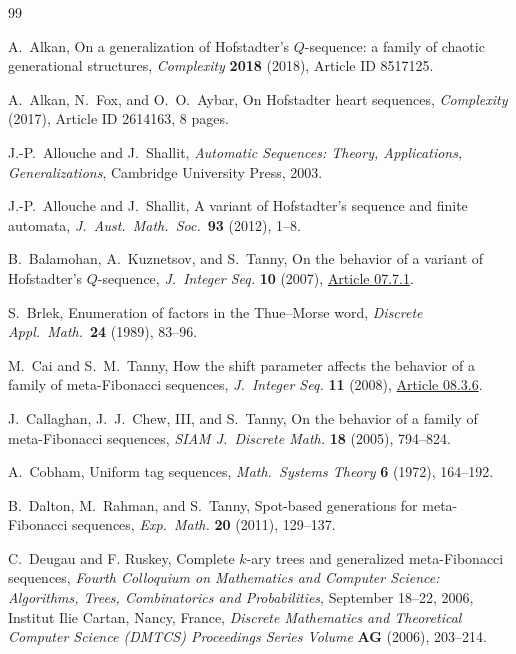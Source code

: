 \documentclass[12pt,reqno]{article}
\theoremstyle{plain}
\theoremstyle{definition}
\theoremstyle{remark}
\begin{document}
\begin{thebibliography}{99}
 
 A.\ Alkan, 
 On a generalization of {Hofstadter}'s {{\(Q\)}}-sequence: a family of chaotic generational structures, 
 {\it Complexity} {\bf 2018} (2018), Article ID 8517125. 
 
 A.\ Alkan, N.\ Fox, and O.\ O.\ Aybar, 
 On Hofstadter heart sequences, 
 {\it Complexity} (2017), Article ID 2614163, 8 pages. 

 J.-P.\ Allouche and J.\ Shallit,
 \emph{Automatic Sequences: Theory, Applications, Generalizations},
 Cambridge University Press, 2003.

 J.-P.\ Allouche and J.\ Shallit,
 A variant of Hofstadter's sequence and finite automata,
 \emph{J.\ Aust.\ Math.\ Soc.}\ \textbf{93} (2012), 1--8.

 B.\ Balamohan, A.\ Kuznetsov, and S.\ Tanny,
 On the behavior of a variant of Hofstadter's {$Q$}-sequence, 
 {\it J.\ Integer Seq.} {\bf 10} 
 (2007), \href{https://cs.uwaterloo.ca/journals/JIS/VOL10/Tanny/tanny3.html}{Article 07.7.1}. 

 S.\ Brlek,
Enumeration of factors in the Thue--Morse word,
\emph{Discrete Appl.\ Math.}\ \textbf{24} (1989), 83--96.

 M.\ Cai and S.\ M.\ Tanny,
 How the shift parameter affects the behavior of a family of meta-{F}ibonacci sequences, 
 {\it J.\ Integer Seq.} {\bf 11} (2008), \href{https://cs.uwaterloo.ca/journals/JIS/VOL11/Tanny2/tanny.html}{Article 08.3.6}. 

 J.\ Callaghan, J.\ J.\ Chew, III, and S.\ Tanny,
 On the behavior of a family of meta-{F}ibonacci sequences, 
 {\it SIAM J.\ Discrete Math.} {\bf 18} (2005), 794--824. 

 A.\ Cobham,
Uniform tag sequences,
\emph{Math.\ Systems Theory} \textbf{6} (1972), 164--192.

 B.\ Dalton, M.\ Rahman, and S.\ Tanny, 
 Spot-based generations for meta-{F}ibonacci sequences, 
 {\it Exp.\ Math.} {\bf 20} (2011), 129--137. 

 C.\ Deugau and F. Ruskey, 
 Complete $k$-ary trees and generalized meta-Fibonacci sequences, 
 \emph{Fourth Colloquium on Mathematics and Computer Science:
 Algorithms, Trees, Combinatorics and Probabilities}, September 18--22, 2006, 
 Institut Ilie Cartan, Nancy, France, 
 \emph{Discrete Mathematics and Theoretical Computer Science (DMTCS) Proceedings Series Volume} {\bf AG}
 (2006), 203--214. 


\end{thebibliography}
\end{document}
